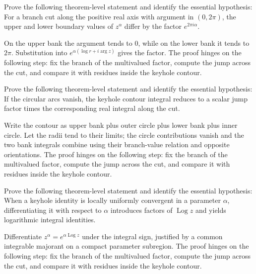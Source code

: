 \begin{problem}\label{prob:iv21-problem-09}
Prove the following theorem-level statement and identify the essential hypothesis: For a branch cut along the positive real axis with argument in $(0,2\pi)$, the upper and lower boundary values of $z^\alpha$ differ by the factor $e^{2\pi i\alpha}$.
\end{problem}
\begin{solution}
On the upper bank the argument tends to $0$, while on the lower bank it tends to $2\pi$. Substitution into $e^{\alpha(\log r+i\arg z)}$ gives the factor. The proof hinges on the following step: fix the branch of the multivalued factor, compute the jump across the cut, and compare it with residues inside the keyhole contour.
\end{solution}

\begin{problem}\label{prob:iv21-problem-10}
Prove the following theorem-level statement and identify the essential hypothesis: If the circular arcs vanish, the keyhole contour integral reduces to a scalar jump factor times the corresponding real integral along the cut.
\end{problem}
\begin{solution}
Write the contour as upper bank plus outer circle plus lower bank plus inner circle. Let the radii tend to their limits; the circle contributions vanish and the two bank integrals combine using their branch-value relation and opposite orientations. The proof hinges on the following step: fix the branch of the multivalued factor, compute the jump across the cut, and compare it with residues inside the keyhole contour.
\end{solution}

\begin{problem}\label{prob:iv21-problem-11}
Prove the following theorem-level statement and identify the essential hypothesis: When a keyhole identity is locally uniformly convergent in a parameter $\alpha$, differentiating it with respect to $\alpha$ introduces factors of $\operatorname{Log} z$ and yields logarithmic integral identities.
\end{problem}
\begin{solution}
Differentiate $z^\alpha=e^{\alpha\operatorname{Log} z}$ under the integral sign, justified by a common integrable majorant on a compact parameter subregion. The proof hinges on the following step: fix the branch of the multivalued factor, compute the jump across the cut, and compare it with residues inside the keyhole contour.
\end{solution}

